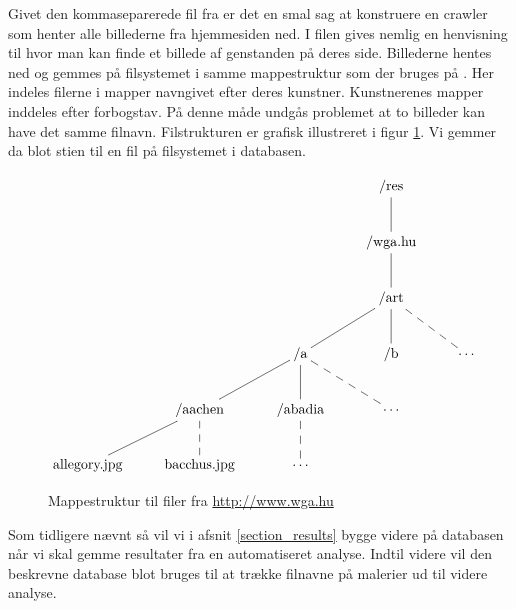 {Givet den kommaseparerede fil fra \cite{wgahu} er det en smal sag at
konstruere en crawler som henter alle billederne fra hjemmesiden ned. I
filen gives nemlig en henvisning til hvor man kan finde et billede af
genstanden på deres side. Billederne hentes ned og gemmes på filsystemet
i samme mappestruktur som der bruges på \cite{wgahu}. Her indeles
filerne i mapper navngivet efter deres kunstner. Kunstnerenes mapper
inddeles efter forbogstav. På denne måde undgås problemet at to billeder
kan have det samme filnavn. Filstrukturen er grafisk illustreret i figur
\ref{mappestruktur}. Vi gemmer da blot stien til en fil på filsystemet i
databasen.

\begin{figure}[!h]
    \centering
$
\xymatrix{
 &  &   & \ar @{-} [d] \textrm{/res}  &                                                     \\
 &  &   & \ar @{-} [d] \textrm{/wga.hu}  &                                                  \\
 &  &   & \ar @{-} [dl] \ar @{-} [d] \ar @{--} [dr] \textrm{/art} &                         \\
 &  & \ar @{-} [dl] \ar @{-} [d] \ar @{--} [dr] \textrm{/a} & \textrm{/b} & \cdots          \\
 & \ar @{-} [dl] \ar @{--} [d] \textrm{/aachen} & \ar @{--} [d] \textrm{/abadia} & \cdots   \\
\textrm{allegory.jpg} & \textrm{bacchus.jpg} & \cdots &   &
}
$
    \caption{Mappestruktur til filer fra
        \href{http://www.wga.hu}{http://www.wga.hu}}
    \label{mappestruktur}
\end{figure}

Som tidligere nævnt så vil vi i afsnit \ref{section_results} bygge
videre på databasen når vi skal gemme resultater fra en automatiseret
analyse. Indtil videre vil den beskrevne database blot bruges til at
trække filnavne på malerier ud til videre analyse.

}
